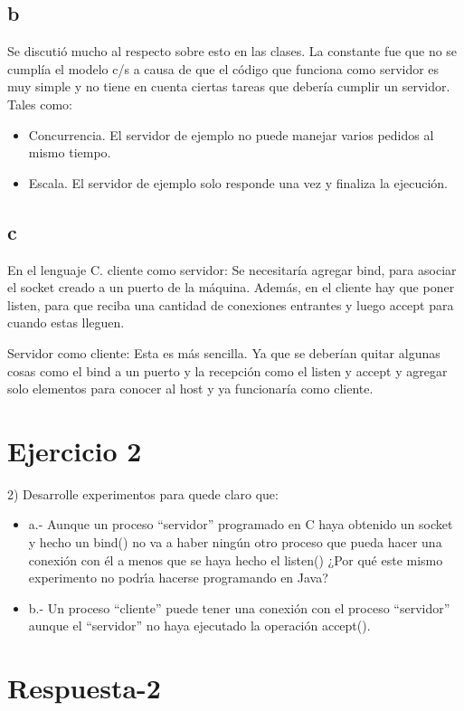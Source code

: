 \documentclass{article}
\begin{document}
		\subsection{b}
		Se discutió mucho al respecto sobre esto en las clases. La constante fue que no se cumplía el modelo c/s a causa de que el código que funciona como servidor es muy simple y no tiene en cuenta ciertas tareas que debería cumplir un servidor.
		Tales como:
		\begin{itemize}
			\item Concurrencia. El servidor de ejemplo no puede manejar varios pedidos al mismo tiempo.
			\item Escala. El servidor de ejemplo solo responde una vez y finaliza la ejecución.
		\end{itemize}
		
		\subsection{c}
		En el lenguaje C.
		cliente como servidor: Se necesitaría agregar bind, para asociar el socket creado a un puerto de la máquina. Además, en el cliente hay que poner listen, para que reciba una cantidad de conexiones entrantes y luego accept para cuando estas lleguen.
		
		Servidor como cliente: Esta es más sencilla. Ya que se deberían quitar algunas cosas como el bind a un puerto y la recepción como el listen y accept y agregar solo elementos para conocer al host y ya funcionaría como cliente.
	
	\section{Ejercicio 2}
		2) Desarrolle experimentos para quede claro que:
		\begin{itemize}
			\item a.- Aunque un proceso “servidor” programado en C haya obtenido un
			socket y hecho un bind() no va a haber ningún otro proceso que pueda
			hacer una conexión con él a menos que se haya hecho el listen() ¿Por qué
			este mismo experimento no podrı́a hacerse programando en Java?
			
			\item b.- Un proceso “cliente” puede tener una conexión con el proceso “servidor” aunque el “servidor” no haya ejecutado la operación accept().
		\end{itemize}
		
		\section*{Respuesta-2}
\end{document}
